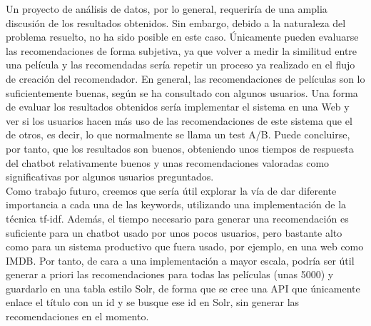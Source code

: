 Un proyecto de análisis de datos, por lo general, requeriría de una amplia discusión de los resultados obtenidos. Sin embargo, debido a la naturaleza del problema resuelto, no ha sido posible en este caso. Únicamente pueden evaluarse las recomendaciones de forma subjetiva, ya que volver a medir la similitud entre una película y las recomendadas sería repetir un proceso ya realizado en el flujo de creación del recomendador. En general, las recomendaciones de películas son lo suficientemente buenas, según se ha consultado con algunos usuarios. Una forma de evaluar los resultados obtenidos sería implementar el sistema en una Web y ver si los usuarios hacen más uso de las recomendaciones de este sistema que el de otros, es decir, lo que normalmente se llama un test A/B. Puede concluirse, por tanto, que los resultados son buenos, obteniendo unos tiempos de respuesta del chatbot relativamente buenos y unas recomendaciones valoradas como significativas por algunos usuarios preguntados.\\

Como trabajo futuro, creemos que sería útil explorar la vía de dar diferente importancia a cada una de las keywords, utilizando una implementación de la técnica tf-idf. Además, el tiempo necesario para generar una recomendación es suficiente para un chatbot usado por unos pocos usuarios, pero bastante alto como para un sistema productivo que fuera usado, por ejemplo, en una web como IMDB. Por tanto, de cara a una implementación a mayor escala, podría ser útil generar a priori las recomendaciones para todas las películas (unas 5000) y guardarlo en una tabla estilo Solr, de forma que se cree una API que únicamente enlace el título con un id y se busque ese id en Solr, sin generar las recomendaciones en el momento.